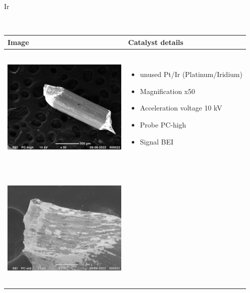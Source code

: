 Ir\documentclass{article}
\begin{document}
\begin{longtable}
\label{tab:long} \\
  \centering
  \begin{tabular}{ | m{7cm} | m{7cm} | }
    \hline
    Image & Catalyst details  \\ \hline
    \begin{minipage}{.3\textwidth}
      \includegraphics[width=60mm, height=60mm]{pictures/ptir1.jpg}
    \end{minipage}
    &
      \begin{itemize}
        \item unused Pt/Ir (Platinum/Iridium)
        \item Magnification x50
        \item Acceleration voltage 10 kV
        \item Probe PC-high
        \item Signal BEI
      \end{itemize} \\ \hline
      \\
    \begin{minipage}{.3\textwidth}
      \includegraphics[width=60mm, height=60mm]{pictures/ptir2.jpg}
    \end{minipage}

\end{tabular}
\end{longtable}
\end{document}
